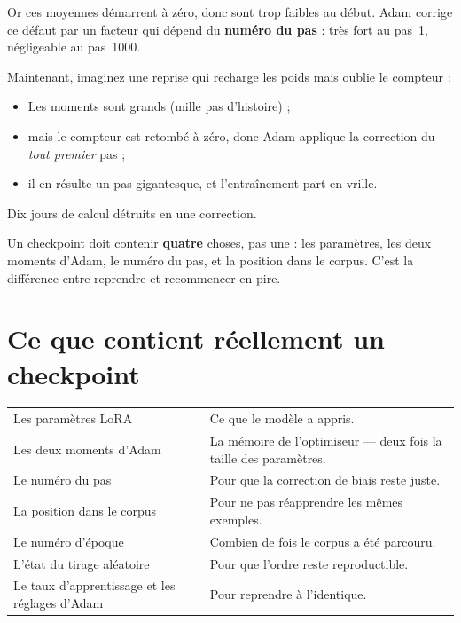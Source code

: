 Or ces moyennes démarrent à zéro, donc sont trop faibles au début. Adam corrige
ce défaut par un facteur qui dépend du \textbf{numéro du pas} : très fort au
pas~1, négligeable au pas~1000.

Maintenant, imaginez une reprise qui recharge les poids mais oublie le
compteur :

\begin{itemize}
  \item Les moments sont grands (mille pas d'histoire) ;
  \item mais le compteur est retombé à zéro, donc Adam applique la correction
        du \emph{tout premier} pas ;
  \item il en résulte un pas gigantesque, et l'entraînement part en vrille.
\end{itemize}

Dix jours de calcul détruits en une correction.

\begin{nkretenir}
Un checkpoint doit contenir \textbf{quatre} choses, pas une : les paramètres,
les deux moments d'Adam, le numéro du pas, et la position dans le corpus. C'est
la différence entre reprendre et recommencer en pire.
\end{nkretenir}

\section{Ce que contient réellement un checkpoint}

\begin{center}
\begin{tabular}{p{4.6cm}p{9.0cm}}
\toprule
Les paramètres LoRA & Ce que le modèle a appris. \\
Les deux moments d'Adam & La mémoire de l'optimiseur — deux fois la taille des
                          paramètres. \\
Le numéro du pas & Pour que la correction de biais reste juste. \\
La position dans le corpus & Pour ne pas réapprendre les mêmes exemples. \\
Le numéro d'époque & Combien de fois le corpus a été parcouru. \\
L'état du tirage aléatoire & Pour que l'ordre reste reproductible. \\
Le taux d'apprentissage et les réglages d'Adam & Pour reprendre à l'identique. \\
\bottomrule
\end{tabular}
\end{center}

